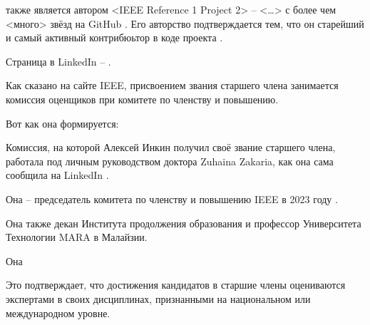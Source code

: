 \MrIeeeReferenceOne также является автором <IEEE Reference 1 Project 2> -- <\dots>
с более чем <много> звёзд на GitHub .
Его авторство подтверждается тем, что он старейший и самый активный контрибюьтор
в коде проекта .

Страница \MrIeeeReferenceOne в LinkedIn -- .

Как сказано на сайте IEEE,
присвоением звания старшего члена занимается комиссия оценщиков при комитете по членству и повышению.

Вот как она формируется:


Комиссия, на которой Алексей Инкин получил своё звание старшего члена,
работала под личным руководством доктора Zuhaina Zakaria, как она сама сообщила на LinkedIn .

Она -- председатель комитета по членству и повышению IEEE в 2023 году .

Она также декан Института продолжения образования и
профессор Университета Технологии MARA в Малайзии.

Она


Это подтверждает, что достижения кандидатов в старшие члены оцениваются
экспертами в своих дисциплинах, признанными на национальном или международном уровне.
